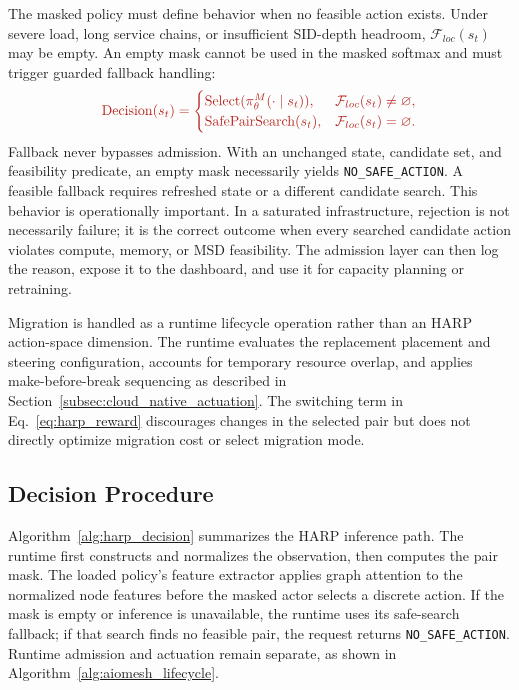 \documentclass[final,5p]{elsarticle}
\newcommand{\rev}[1]{\textcolor{BrickRed}{#1}}
\begin{document}
The masked policy must define behavior when no feasible action exists. Under severe load, long service chains, or insufficient SID-depth headroom, \(\mathcal{F}_{loc}(s_t)\) may be empty. \rev{An empty mask cannot be used in the masked softmax and must trigger guarded fallback handling:}
\begin{equation}
\rev{\mathrm{Decision}(s_t)=
\begin{cases}
\mathrm{Select}(\pi_\theta^M(\cdot\mid s_t)), & \mathcal{F}_{loc}(s_t)\ne\varnothing,\\
\mathrm{SafePairSearch}(s_t), & \mathcal{F}_{loc}(s_t)=\varnothing.
\end{cases}}
\end{equation}
\rev{Fallback never bypasses admission. With an unchanged state, candidate set, and feasibility predicate, an empty mask necessarily yields \texttt{NO\_SAFE\_ACTION}. A feasible fallback requires refreshed state or a different candidate search.} This behavior is operationally important. In a saturated infrastructure, rejection is not necessarily failure; it is the correct outcome when every \rev{searched} candidate action violates compute, memory, or MSD feasibility. The admission layer can then log the reason, expose it to the dashboard, and use it for capacity planning or retraining.

\rev{Migration is handled as a runtime lifecycle operation rather than an HARP action-space dimension. The runtime evaluates the replacement placement and steering configuration, accounts for temporary resource overlap, and applies make-before-break sequencing as described in Section~\ref{subsec:cloud_native_actuation}. The switching term in Eq.~\eqref{eq:harp_reward} discourages changes in the selected pair but does not directly optimize migration cost or select migration mode.}

\subsection{Decision Procedure}
\label{subsec:harp_decision_procedure}

Algorithm~\ref{alg:harp_decision} summarizes the HARP inference path. The runtime first constructs and normalizes the observation, then computes the pair mask. The loaded policy's feature extractor applies graph attention to the normalized node features before the masked actor selects a discrete action. \rev{If the mask is empty or inference is unavailable, the runtime uses its safe-search fallback; if that search finds no feasible pair, the request returns \texttt{NO\_SAFE\_ACTION}. Runtime admission and actuation remain separate, as shown in Algorithm~\ref{alg:aiomesh_lifecycle}.}
\end{document}
